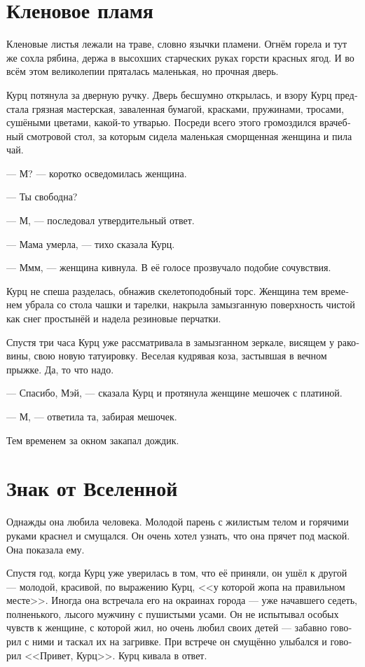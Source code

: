 \documentclass[a4paper,12pt,fleqn]{book}\usepackage{cooltooltips}\usepackage{polyglossia}\setdefaultlanguage[babelshorthands=true]{russian}\setotherlanguage{english}\defaultfontfeatures{Ligatures=TeX,Mapping=tex-text} \usepackage{xcolor}\definecolor{lightgray}{HTML}{bbbbbb}\color{lightgray}\newcommand{\ml}[3]{\textenglish{\textcolor{black}{#3}}}
\begin{document}
\section{Кленовое пламя}

Кленовые листья лежали на траве, словно язычки пламени.
Огнём горела и тут же сохла рябина, держа в высохших старческих руках горсти красных ягод.
И во всём этом великолепии пряталась маленькая, но прочная дверь.

Курц потянула за дверную ручку.
Дверь бесшумно открылась, и взору Курц предстала грязная мастерская, заваленная бумагой, красками, пружинами, тросами, сушёными цветами, какой-то утварью.
Посреди всего этого громоздился врачебный смотровой стол, за которым сидела маленькая сморщенная женщина и пила чай.

--- М? --- коротко осведомилась женщина.

--- Ты свободна?

--- М, --- последовал утвердительный ответ.

--- Мама умерла, --- тихо сказала Курц.

--- Ммм, --- женщина кивнула.
В её голосе прозвучало подобие сочувствия.

Курц не спеша разделась, обнажив скелетоподобный торс.
Женщина тем временем убрала со стола чашки и тарелки, накрыла замызганную поверхность чистой как снег простынёй и надела резиновые перчатки.

Спустя три часа Курц уже рассматривала в замызганном зеркале, висящем у раковины, свою новую татуировку.
Веселая кудрявая коза, застывшая в вечном прыжке.
Да, то что надо.

--- Спасибо, Мэй, --- сказала Курц и протянула женщине мешочек с платиной.

--- М, --- ответила та, забирая мешочек.

Тем временем за окном закапал дождик.

\section{Знак от Вселенной}

Однажды она любила человека.
Молодой парень с жилистым телом и горячими руками краснел и смущался.
Он очень хотел узнать, что она прячет под маской.
Она показала ему.

Спустя год, когда Курц уже уверилась в том, что её приняли, он ушёл к другой --- молодой, красивой, по выражению Курц, <<у которой жопа на правильном месте>>.
Иногда она встречала его на окраинах города --- уже начавшего седеть, полненького, лысого мужчину с пушистыми усами.
Он не испытывал особых чувств к женщине, с которой жил, но очень любил своих детей --- забавно говорил с ними и таскал их на загривке.
При встрече он смущённо улыбался и говорил <<Привет, Курц>>.
Курц кивала в ответ.
\end{document}
